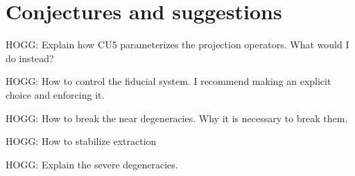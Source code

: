 \documentclass[11pt]{article}
\begin{document}
\section{Conjectures and suggestions}

HOGG: Explain how CU5 parameterizes the projection operators. What would I do instead?

HOGG: How to control the fiducial system. I recommend making an explicit choice and enforcing it.

HOGG: How to break the near degeneracies. Why it is necessary to break them.

HOGG: How to stabilize extraction 

HOGG: Explain the severe degeneracies.
\end{document}
